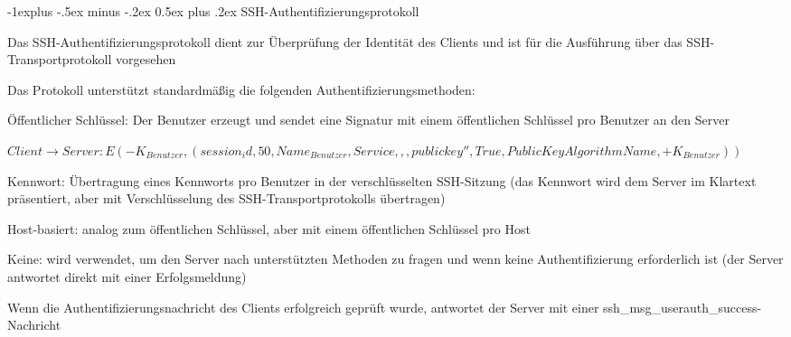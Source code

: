 \documentclass[a4paper]{article}
\makeatletter
\renewcommand{\subsection}{\@startsection{subsection}{2}{0mm}%
 {-1explus -.5ex minus -.2ex}%
 {0.5ex plus .2ex}%
 {\normalfont\normalsize\bfseries}}
\makeatother
\begin{document}
\begin{multicols}{3}
      \subsection{SSH-Authentifizierungsprotokoll}
      \begin{itemize*}
            \item Das SSH-Authentifizierungsprotokoll dient zur Überprüfung der Identität des Clients und ist für die Ausführung über das SSH-Transportprotokoll vorgesehen
            \item Das Protokoll unterstützt standardmäßig die folgenden Authentifizierungsmethoden:
            \begin{itemize*}
                  \item Öffentlicher Schlüssel: Der Benutzer erzeugt und sendet eine Signatur mit einem öffentlichen Schlüssel pro Benutzer an den Server
                  \item $Client\rightarrow Server: E(-K_{Benutzer}, (session_id, 50, Name_{Benutzer}, Service, ,,publickey'', True, PublicKeyAlgorithmName, +K_{Benutzer}))$
                  \item Kennwort: Übertragung eines Kennworts pro Benutzer in der verschlüsselten SSH-Sitzung (das Kennwort wird dem Server im Klartext präsentiert, aber mit Verschlüsselung des SSH-Transportprotokolls übertragen)
                  \item Host-basiert: analog zum öffentlichen Schlüssel, aber mit einem öffentlichen Schlüssel pro Host
                  \item Keine: wird verwendet, um den Server nach unterstützten Methoden zu fragen und wenn keine Authentifizierung erforderlich ist (der Server antwortet direkt mit einer Erfolgsmeldung)
            \end{itemize*}
            \item Wenn die Authentifizierungsnachricht des Clients erfolgreich geprüft wurde, antwortet der Server mit einer ssh\_msg\_userauth\_success-Nachricht
      \end{itemize*}


\end{multicols}
\end{document}
